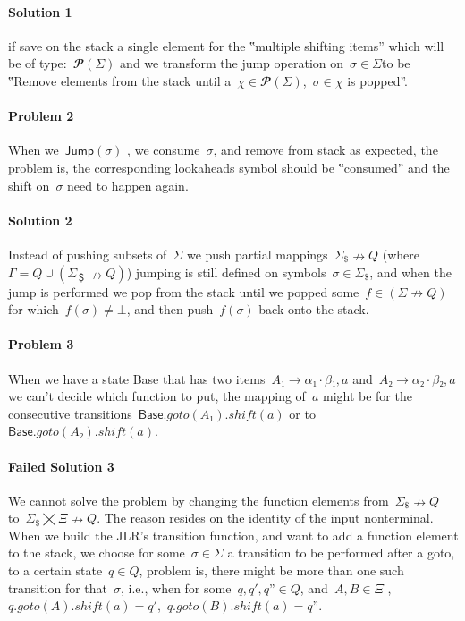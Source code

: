 \paragraph{Solution 1} if save on the stack a single element for the
  ‟multiple shifting items” which will be of type:~$𝓟(Σ)$
  and we transform the jump operation on~$σ∈Σ$to be ‟Remove elements
  from the stack until a~$χ∈𝓟(Σ)$,~$σ∈χ$ is popped”.

\paragraph{Problem 2} When we~$\textsf{Jump}(σ)$ , we consume~$σ$, and remove
  from stack as expected, the problem is, the corresponding lookaheads symbol
  should be ‟consumed” and the shift on~$σ$ need to happen again.

\paragraph{Solution 2} Instead of pushing subsets of~$Σ$ we push partial
  mappings~$Σ_{\$}↛Q$ (where~$Γ=Q∪(Σ_{＄}↛Q)$) jumping is still defined
  on symbols~$σ∈Σ_{\$}$, and when the jump is performed we pop from the stack
  until we popped some~$f∈(Σ↛Q)$ for which~$f(σ)≠⊥$, and then push~$f(σ)$ back onto the stack.

\paragraph{Problem 3} When we have a state \textsf{Base} that has
  two items~$A₁→α₁·β₁,a$ and~$A₂→α₂·β₂,a$ we can't decide which function to put,
  the mapping of~$a$ might be for the consecutive
  transitions~$\textsf{Base}.goto(A₁).shift(a)$ or to~$\textsf{Base}.goto(A₂).shift(a)$.

\paragraph{Failed Solution 3} We cannot solve the problem by changing the function elements from~$Σ_\$↛Q$
  to~$Σ_\$⨉Ξ↛Q$. The reason resides on the identity of the input nonterminal.
  When we build the JLR's transition function, and want to add a function element to the stack, we choose for some~$σ∈Σ$
  a transition to be performed after a goto, to a certain state~$q∈Q$, problem is, there might be more than one such transition
  for that~$σ$, i.e., when for some~$q,q',q”∈Q$, and~$A,B∈Ξ$ ,~$q.goto(A).shift(a)=q'$,~$q.goto(B).shift(a)=q”$.

